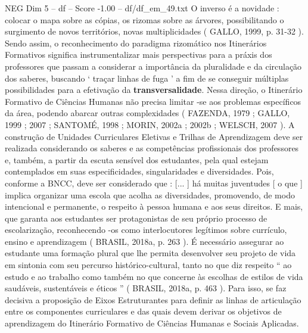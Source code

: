 \begin{textsample}{NEG Dim 5 – df – Score -1.00 – df/df\_em\_49.txt}
O inverso é a novidade : colocar o mapa sobre as cópias, os rizomas sobre as árvores, possibilitando o surgimento de novos territórios, novas multiplicidades ( GALLO, 1999, p. 31-32 ).
Sendo assim, o reconhecimento do paradigma rizomático nos Itinerários Formativos significa instrumentalizar mais perspectivas para a práxis dos professores que passam a considerar a importância da pluralidade e da circulação dos saberes, buscando ‘ traçar linhas de fuga ’ a fim de se conseguir múltiplas possibilidades para a efetivação da \textbf{transversalidade}.
Nessa direção, o Itinerário Formativo de Ciências Humanas não precisa limitar -se aos problemas específicos da área, podendo abarcar outras complexidades ( FAZENDA, 1979 ; GALLO, 1999 ; 2007 ; SANTOMÉ, 1998 ; MORIN, 2002a ; 2002b ; WELSCH, 2007 ).
A construção de Unidades Curriculares Eletivas e Trilhas de Aprendizagem deve ser realizada considerando os saberes e as competências profissionais dos professores e, também, a partir da escuta sensível dos estudantes, pela qual estejam contemplados em suas especificidades, singularidades e diversidades.
Pois, conforme a BNCC, deve ser considerado que : [... ] há muitas juventudes [ o que ] implica organizar uma escola que acolha as diversidades, promovendo, de modo intencional e permanente, o respeito à pessoa humana e aos seus direitos.
E mais, que garanta aos estudantes ser protagonistas de seu próprio processo de escolarização, reconhecendo -os como interlocutores legítimos sobre currículo, ensino e aprendizagem ( BRASIL, 2018a, p. 263 ).
É necessário assegurar ao estudante uma formação plural que lhe permita desenvolver seu projeto de vida em sintonia com seu percurso histórico-cultural, tanto no que diz respeito “ ao estudo e ao trabalho como também no que concerne às escolhas de estilos de vida saudáveis, sustentáveis e éticos ” ( BRASIL, 2018a, p. 463 ).
Para isso, se faz decisiva a proposição de Eixos Estruturantes para definir as linhas de articulação entre os componentes curriculares e das quais devem derivar os objetivos de aprendizagem do Itinerário Formativo de Ciências Humanas e Sociais Aplicadas.

\end{textsample}
